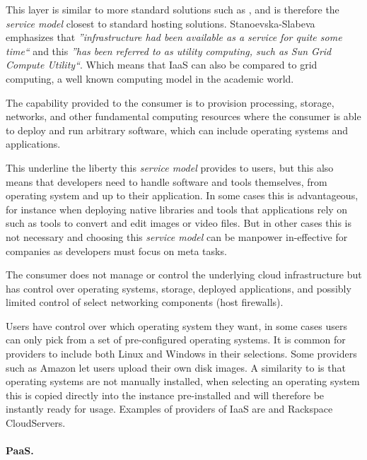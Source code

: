 This layer is similar to more standard solutions such as ,
and is therefore the \emph{service model} closest to standard hosting solutions.
Stanoevska-Slabeva~\cite{introduction:wozniak10} emphasizes that
\emph{''infrastructure had been available as a service for quite some time``} and this 
\emph{''has been referred to as utility computing, such as Sun Grid Compute Utility``}.
Which means that IaaS can also be compared to grid computing, 
a well known computing model in the academic world.
\epigraph{The capability provided to the consumer is to provision 
  processing, storage, networks, and other fundamental computing resources where the 
  consumer is able to deploy and run arbitrary software, which can include operating 
  systems and applications.
}{\citet{nist:mell11}}
This underline the liberty this \emph{service model} provides to users, but this also means
that developers need to handle software and tools themselves, from operating system and
up to their application. In some cases this is advantageous, for instance when deploying 
native libraries and tools that applications rely on such as tools to convert and edit
images or video files. But in other cases this is not necessary and choosing this \emph{service model}
can be manpower in-effective for companies as developers must focus on meta tasks.
\epigraph{The consumer does not manage or control the underlying cloud 
  infrastructure but has control over operating systems, storage, deployed applications, and 
  possibly limited control of select networking components (\eg host firewalls).
}{\citet{nist:mell11}}
Users have control over which operating system they want, in some cases users
can only pick from a set of pre-configured operating systems.
It is common for providers to include both Linux and Windows in their selections.
Some providers such as Amazon let users upload their own disk images.
A similarity to  is that operating systems are not manually installed,
when selecting an operating system this is copied directly into the instance pre-installed
and will therefore be instantly ready for usage.
Examples of providers of IaaS are   and Rackspace CloudServers.

\paragraph{PaaS.}

